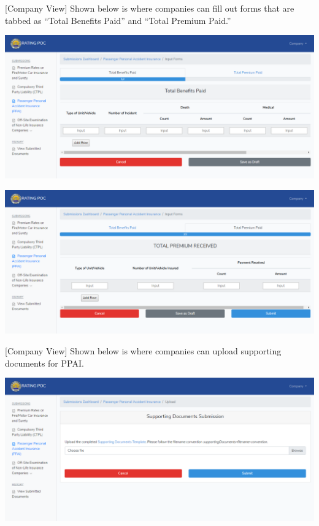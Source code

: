 \documentclass{article}
\begin{document}
[Company View] Shown below is where companies can
fill out forms that are tabbed as “Total Benefits Paid” and “Total
Premium Paid.”%

\includegraphics[keepaspectratio=true]{up-ic-screens/image207}{}%

\includegraphics[keepaspectratio=true]{up-ic-screens/image30}{}%

[Company View] Shown below is where companies can
upload supporting documents for PPAI.%

\includegraphics[keepaspectratio=true]{up-ic-screens/image109}{}%
\end{document}
